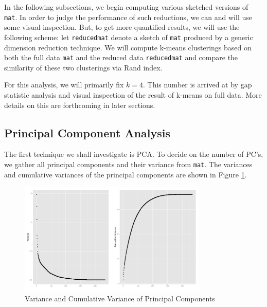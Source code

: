 In the following subsections, we begin computing various sketched versions of \verb|mat|. In order to judge the performance of such reductions, we can and will use some visual inspection. But, to get more quantified results, we will use the following scheme: let \verb|reducedmat| denote a sketch of \verb|mat| produced by a generic dimension reduction technique. We will compute k-means clusterings based on both the full data \verb|mat| and the reduced data \verb|reducedmat| and compare the similarity of these two clusterings via Rand index.

For this analysis, we will primarily fix $k=4$. This number is arrived at by gap statistic analysis and visual inspection of the result of k-means on full data. More details on this are forthcoming in later sections.

\subsection{Principal Component Analysis}

The first technique we shall investigate is PCA. To decide on the number of PC's, we gather all principal components and their variance from \verb|mat|. The variances and cumulative variances of the principal components are shown in Figure \ref{fig:pcvars}.

\begin{figure}[ht]
	\centering
	\includegraphics[width=0.8\textwidth]{fig/plot1.png}
	\caption{Variance and Cumulative Variance of Principal Components}
	\label{fig:pcvars}
\end{figure}


